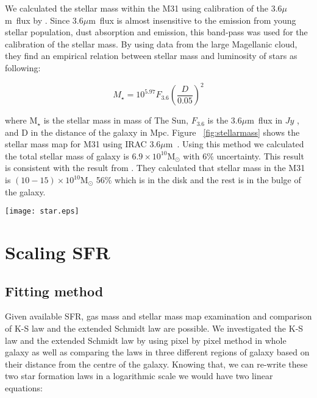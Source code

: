 \documentclass[useAMS,usenatbib]{mn2e}
\newcommand \um    {$\mu$m\ }
\begin{document}
We calculated the stellar mass within the M31 using calibration of the 3.6\um flux by \cite{Eskew12}.  Since 3.6\um flux is almost insensitive to the emission from young stellar population, dust absorption and emission, this band-pass was used for the calibration of the stellar mass. By using data from the large Magellanic cloud, they find an empirical relation between stellar mass and luminosity of stars as following:

\begin{equation}
\label{equ:eskew}
M _{\star}= 10^{5.97} F_{3.6}(\frac{D}{0.05})^2
\end{equation}

where M$_{\star}$ is the stellar mass in mass of The Sun, $F_{3.6}$ is the 3.6\um flux in $Jy$ , and D in the distance of the galaxy in Mpc. Figure ~\ref{fig:stellarmass} shows the stellar mass map for M31 using IRAC 3.6\um. Using this method we calculated the total stellar mass of galaxy is $6.9 \times 10^{10}$M$_{\odot}$ with 6$\%$ uncertainty. This result is consistent with the result from \cite{Tamm2012}. They calculated that stellar mass in the M31 is $(10-15) \times 10^{10}$M$_{\odot}$ 56$\%$ which is in the disk and the rest is in the bulge of the galaxy.   %
\begin{figure*}
\centering
\texttt{[image: star.eps]}
\caption{Stellar Mass surface density. This mass is produced using $IRAC$ 3.6 $\mu$ m data and its calibration presented in equation ~\ref{equ:eskew}}
\label{fig:stellarmass}
\end{figure*}


\section{Scaling SFR}
\subsection{Fitting method}
Given available SFR, gas mass and stellar mass map examination and comparison of K-S law and the extended Schmidt law are possible. We investigated the K-S law and the extended Schmidt law by using  pixel by pixel method in whole galaxy as well as comparing the laws in three different regions of galaxy based on their distance from the centre of the galaxy. Knowing that, we can re-write these two star formation laws in a logarithmic scale we would have two linear equations:
\end{document}
